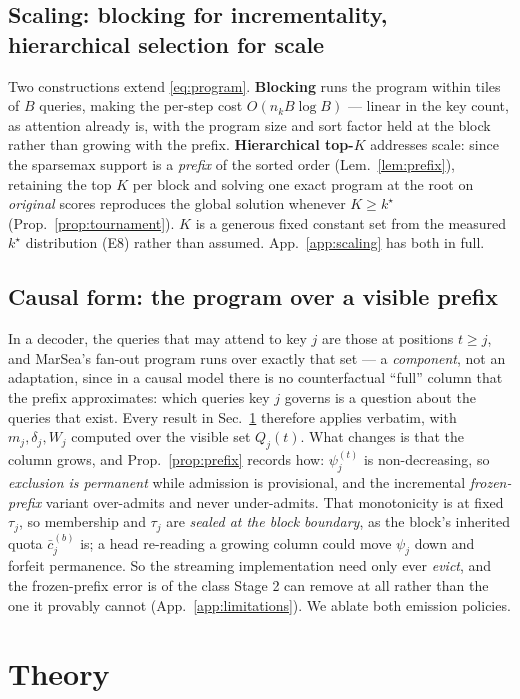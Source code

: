 \documentclass{article}
\begin{document}
\subsection{Scaling: blocking for incrementality, hierarchical selection for scale}
\label{sec:method-scale}
Two constructions extend \eqref{eq:program}. \textbf{Blocking} runs the program within tiles of
$B$ queries, making the per-step cost $O(n_kB\log B)$ --- linear in the key count, as attention
already is, with the program size and sort factor held at the block rather than growing with the
prefix. \textbf{Hierarchical top-$K$} addresses scale: since the sparsemax support is a
\emph{prefix} of the sorted order (Lem.~\ref{lem:prefix}), retaining the top $K$ per block and
solving one exact program at the root on \emph{original} scores reproduces the global solution
whenever $K\ge k^\star$ (Prop.~\ref{prop:tournament}). $K$ is a generous fixed constant set from
the measured $k^\star$ distribution (E8) rather than assumed. App.~\ref{app:scaling} has both in
full.

\subsection{Causal form: the program over a visible prefix}
\label{sec:method-causal}
In a decoder, the queries that may attend to key $j$ are those at positions $t \ge j$, and
MarSea's fan-out program runs over exactly that set --- a \emph{component}, not an adaptation,
since in a causal model there is no counterfactual ``full'' column that the prefix approximates:
which queries key $j$ governs is a question about the queries that exist. Every result in
Sec.~\ref{sec:theory} therefore applies verbatim, with $m_j,\delta_j,W_j$ computed over the
visible set $Q_j(t)$. What changes is that the column grows, and
Prop.~\ref{prop:prefix} records how: $\psi_j^{(t)}$ is non-decreasing, so \emph{exclusion is
permanent} while admission is provisional, and the incremental \emph{frozen-prefix} variant
over-admits and never under-admits. That monotonicity is at fixed $\tau_j$, so membership
and $\tau_j$ are \emph{sealed at the block boundary}, as the block's inherited quota
$\bar c^{(b)}_j$ is; a head re-reading a
growing column could move $\psi_j$ down and forfeit permanence. So the streaming implementation
need only ever \emph{evict}, and the frozen-prefix error is of the class Stage 2 can remove at
all rather than the one it provably cannot (App.~\ref{app:limitations}). We ablate both emission
policies.

\section{Theory}
\label{sec:theory}
\end{document}
